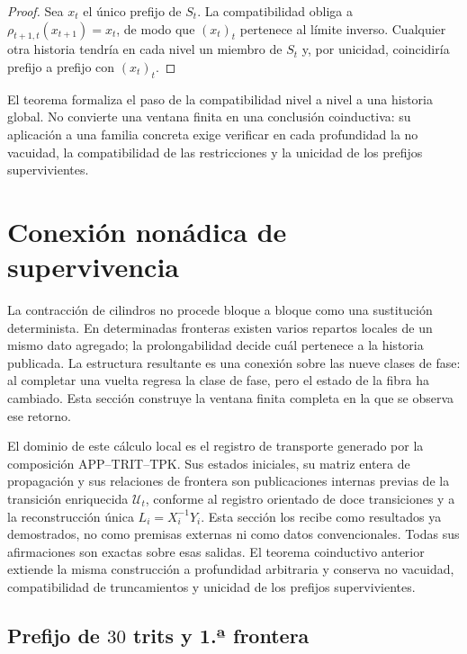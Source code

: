 \begin{proof}
Sea \(x_t\) el único prefijo de \(S_t\). La compatibilidad obliga a
\(\rho_{t+1,t}(x_{t+1})=x_t\), de modo que \((x_t)_t\) pertenece al límite
inverso. Cualquier otra historia tendría en cada nivel un miembro de \(S_t\)
y, por unicidad, coincidiría prefijo a prefijo con \((x_t)_t\).
\end{proof}

El teorema formaliza el paso de la compatibilidad nivel a nivel a una historia
global. No convierte una ventana finita en una conclusión coinductiva: su
aplicación a una familia concreta exige verificar en cada profundidad la no
vacuidad, la compatibilidad de las restricciones y la unicidad de los prefijos
supervivientes.

\section{Conexión nonádica de supervivencia}
\label{sec:conexion-nonadica}

La contracción de cilindros no procede bloque a bloque como una sustitución
determinista. En determinadas fronteras existen varios repartos locales de un
mismo dato agregado; la prolongabilidad decide cuál pertenece a la historia
publicada. La estructura resultante es una conexión sobre las nueve clases de
fase: al completar una vuelta regresa la clase de fase, pero el estado de la
fibra ha cambiado. Esta sección construye la ventana finita completa en la que
se observa ese retorno.

El dominio de este cálculo local es el registro de transporte generado por la
composición APP--TRIT--TPK. Sus estados iniciales, su matriz entera de
propagación y sus relaciones de frontera son publicaciones internas previas de
la transición enriquecida \(\mathcal U_t\), conforme al registro orientado de
doce transiciones y a la reconstrucción única
\(L_i=X_i^{-1}Y_i\). Esta sección los recibe como resultados ya demostrados,
no como premisas externas ni como datos convencionales. Todas sus afirmaciones
son exactas sobre esas salidas. El teorema coinductivo anterior extiende la
misma construcción a profundidad arbitraria y conserva no vacuidad,
compatibilidad de truncamientos y unicidad de los prefijos supervivientes.

\subsection{Prefijo de \(30\) trits y 1.ª frontera}

